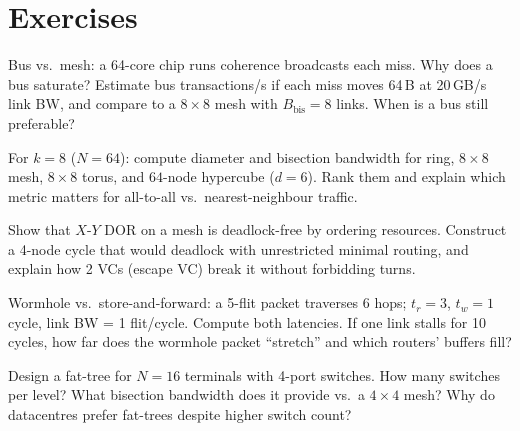 \section{Exercises}
\begin{exercise}Bus vs.\ mesh: a 64-core chip runs coherence broadcasts each miss. Why does a bus saturate? Estimate bus transactions/s if each miss moves 64\,B at 20\,GB/s link BW, and compare to a $8\times8$ mesh with $B_{\text{bis}}=8$ links. When is a bus still preferable?\end{exercise}
\begin{exercise}For $k=8$ ($N=64$): compute diameter and bisection bandwidth for ring, $8\times8$ mesh, $8\times8$ torus, and $64$-node hypercube ($d=6$). Rank them and explain which metric matters for all-to-all vs.\ nearest-neighbour traffic.\end{exercise}
\begin{exercise}Show that $X$-$Y$ DOR on a mesh is deadlock-free by ordering resources. Construct a 4-node cycle that would deadlock with unrestricted minimal routing, and explain how 2 VCs (escape VC) break it without forbidding turns.\end{exercise}
\begin{exercise}Wormhole vs.\ store-and-forward: a 5-flit packet traverses 6 hops; $t_r=3$, $t_w=1$ cycle, link BW = 1 flit/cycle. Compute both latencies. If one link stalls for 10 cycles, how far does the wormhole packet ``stretch'' and which routers' buffers fill?\end{exercise}
\begin{exercise}Design a fat-tree for $N=16$ terminals with 4-port switches. How many switches per level? What bisection bandwidth does it provide vs.\ a $4\times4$ mesh? Why do datacentres prefer fat-trees despite higher switch count?\end{exercise}
